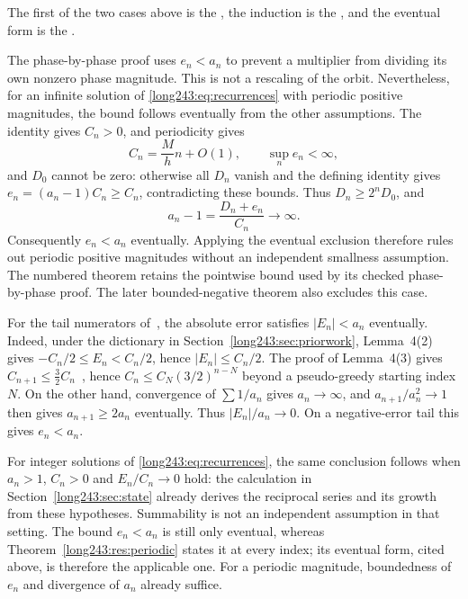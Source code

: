 \documentclass[11pt]{article}
\begin{document}
\noindent The first of the two cases above is the
, the induction is the
, and the eventual form is the
.

The phase-by-phase proof uses $e_n<a_n$ to prevent a multiplier from
dividing its own nonzero phase magnitude. This is not a rescaling of the
orbit. Nevertheless, for an infinite solution of \eqref{long243:eq:recurrences} with periodic positive
magnitudes, the bound follows eventually from the other assumptions.
The identity gives $C_n>0$, and periodicity gives
\[
 C_n=\frac{M}{h}n+O(1),\qquad \sup_ne_n<\infty,
\]
and $D_0$ cannot be zero: otherwise all $D_n$ vanish and the defining identity gives $e_n=(a_n-1)C_n\ge C_n$, contradicting these bounds.
Thus $D_n\ge2^nD_0$, and
\[
 a_n-1=\frac{D_n+e_n}{C_n}\longrightarrow\infty.
\]
Consequently $e_n<a_n$ eventually. Applying the eventual exclusion
therefore rules out periodic positive magnitudes without an independent
smallness assumption. The numbered theorem retains the pointwise bound
used by its checked phase-by-phase proof. The later bounded-negative
theorem also excludes this case.

\begin{remark}\label{long243:rem:eventual-error-bound}
For the tail numerators of~\cite{koizumi2025}, the absolute error
satisfies $|E_n|<a_n$ eventually. Indeed, under the dictionary in
Section~\ref{long243:sec:priorwork}, Lemma~4(2) gives
$-C_n/2\le E_n<C_n/2$, hence $|E_n|\le C_n/2$. The proof of Lemma~4(3) gives
$C_{n+1}\le\tfrac32C_n$~\cite[pp.~11--12]{koizumi2025}, hence
$C_n\le C_N(3/2)^{n-N}$ beyond a pseudo-greedy starting index $N$.
On the other hand, convergence of $\sum1/a_n$ gives $a_n\to\infty$,
and $a_{n+1}/a_n^2\to1$ then gives $a_{n+1}\ge2a_n$ eventually.
Thus $|E_n|/a_n\to0$. On a negative-error tail this gives $e_n<a_n$.

For integer solutions of \eqref{long243:eq:recurrences}, the same conclusion follows when
$a_n>1$, $C_n>0$ and $E_n/C_n\to0$ hold: the calculation in
Section~\ref{long243:sec:state} already derives the reciprocal series and
its growth from these hypotheses. Summability is not an independent
assumption in that setting. The bound $e_n<a_n$ is still only eventual,
whereas Theorem~\ref{long243:res:periodic} states it at every index;
its eventual form, cited above, is therefore the applicable one.
For a periodic magnitude, boundedness of $e_n$ and divergence of $a_n$
already suffice.
\end{remark}
\end{document}
